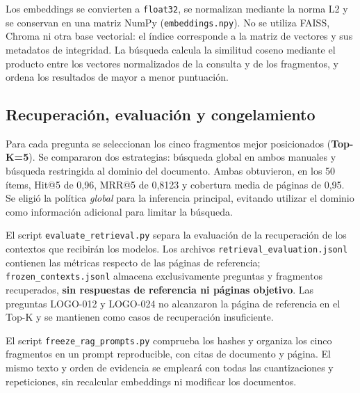 \documentclass[11pt,a4paper]{article}
\begin{document}
Los embeddings se convierten a \texttt{float32}, se normalizan mediante la norma L2 y se conservan en una matriz NumPy (\texttt{embeddings.npy}). No se utiliza FAISS, Chroma ni otra base vectorial: el índice corresponde a la matriz de vectores y sus metadatos de integridad. La búsqueda calcula la similitud coseno mediante el producto entre los vectores normalizados de la consulta y de los fragmentos, y ordena los resultados de mayor a menor puntuación.

\subsection{Recuperación, evaluación y congelamiento}
Para cada pregunta se seleccionan los cinco fragmentos mejor posicionados (\textbf{Top-K=5}). Se compararon dos estrategias: búsqueda global en ambos manuales y búsqueda restringida al dominio del documento. Ambas obtuvieron, en los 50 ítems, Hit@5 de 0,96, MRR@5 de 0,8123 y cobertura media de páginas de 0,95. Se eligió la política \emph{global} para la inferencia principal, evitando utilizar el dominio como información adicional para limitar la búsqueda.

El script \texttt{evaluate\_retrieval.py} separa la evaluación de la recuperación de los contextos que recibirán los modelos. Los archivos \texttt{retrieval\_evaluation.jsonl} contienen las métricas respecto de las páginas de referencia; \texttt{frozen\_contexts.jsonl} almacena exclusivamente preguntas y fragmentos recuperados, \textbf{sin respuestas de referencia ni páginas objetivo}. Las preguntas LOGO-012 y LOGO-024 no alcanzaron la página de referencia en el Top-K y se mantienen como casos de recuperación insuficiente.

El script \texttt{freeze\_rag\_prompts.py} comprueba los hashes y organiza los cinco fragmentos en un prompt reproducible, con citas de documento y página. El mismo texto y orden de evidencia se empleará con todas las cuantizaciones y repeticiones, sin recalcular embeddings ni modificar los documentos.
\end{document}
